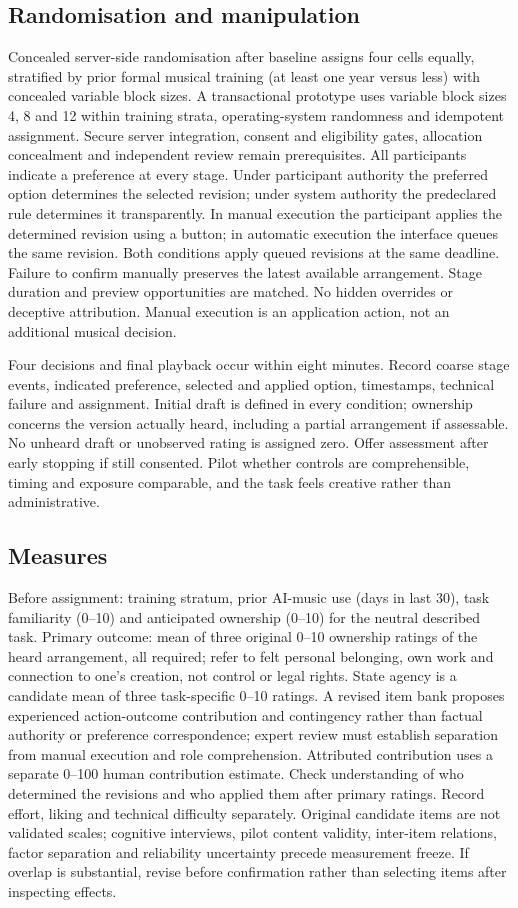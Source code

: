 \documentclass[11pt]{article}
\begin{document}
\subsection{Randomisation and manipulation}
Concealed server-side randomisation after baseline assigns four cells equally, stratified by prior formal musical training (at least one year versus less) with concealed variable block sizes. A transactional prototype uses variable block sizes 4, 8 and 12 within training strata, operating-system randomness and idempotent assignment. Secure server integration, consent and eligibility gates, allocation concealment and independent review remain prerequisites. All participants indicate a preference at every stage. Under participant authority the preferred option determines the selected revision; under system authority the predeclared rule determines it transparently. In manual execution the participant applies the determined revision using a button; in automatic execution the interface queues the same revision. Both conditions apply queued revisions at the same deadline. Failure to confirm manually preserves the latest available arrangement. Stage duration and preview opportunities are matched. No hidden overrides or deceptive attribution. Manual execution is an application action, not an additional musical decision.
\par Four decisions and final playback occur within eight minutes. Record coarse stage events, indicated preference, selected and applied option, timestamps, technical failure and assignment. Initial draft is defined in every condition; ownership concerns the version actually heard, including a partial arrangement if assessable. No unheard draft or unobserved rating is assigned zero. Offer assessment after early stopping if still consented. Pilot whether controls are comprehensible, timing and exposure comparable, and the task feels creative rather than administrative.
\subsection{Measures}
Before assignment: training stratum, prior AI-music use (days in last 30), task familiarity (0--10) and anticipated ownership (0--10) for the neutral described task. Primary outcome: mean of three original 0--10 ownership ratings of the heard arrangement, all required; refer to felt personal belonging, own work and connection to one's creation, not control or legal rights. State agency is a candidate mean of three task-specific 0--10 ratings. A revised item bank proposes experienced action-outcome contribution and contingency rather than factual authority or preference correspondence; expert review must establish separation from manual execution and role comprehension. Attributed contribution uses a separate 0--100 human contribution estimate. Check understanding of who determined the revisions and who applied them after primary ratings. Record effort, liking and technical difficulty separately. Original candidate items are not validated scales; cognitive interviews, pilot content validity, inter-item relations, factor separation and reliability uncertainty precede measurement freeze. If overlap is substantial, revise before confirmation rather than selecting items after inspecting effects.
\end{document}
